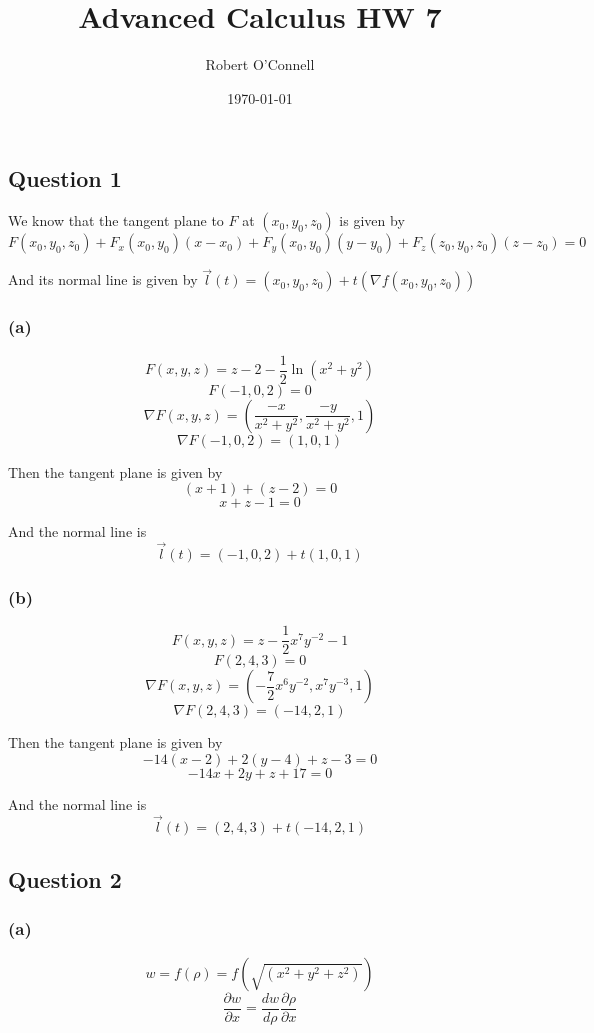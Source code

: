 \documentclass{article}
\title{\textbf{Advanced Calculus HW 7}}
\author{Robert O'Connell}
\date{\today}
\begin{document}
\maketitle
\vspace{5mm}
\subsection*{Question 1}
We know that the tangent plane to \(F\) at \((x_0, y_0,z_0)\) is given by
\[
F(x_0,y_0,z_0) + F_x(x_0,y_0)(x-x_0) + F_y(x_0,y_0)(y-y_0)  + F_z(z_0,y_0,z_0)(z-z_0) = 0
\]

And its normal line is given by \(\vec{l}(t) = (x_0,y_0,z_0) + t(\nabla f(x_0,y_0,z_0))\)

\subsubsection*{(a)}
\[
F(x,y,z) = z - 2 - \frac{1}{2}\ln(x^2 + y^2)
\]
\[
F(-1,0,2) = 0
\]
\[
\nabla F(x,y,z) = (\frac{-x}{x^2 + y^2}, \frac{-y}{x^2 + y^2},  1)
\]
\[
\nabla F(-1,0,2) = (1,0,1)
\]

Then the tangent plane is given by
\[
(x+1) + (z-2) = 0
\]
\[
x+z-1 =0
\]

And the normal line is 
\[
\vec{l}(t) = (-1,0,2) + t(1,0,1)
\]

\subsubsection*{(b)}
\[
F(x,y,z) = z - \frac{1}{2}x^7y^{-2} -1
\]
\[
F(2,4,3) = 0
\]
\[
\nabla F(x,y,z) = (-\frac{7}{2}x^6y^{-2}, x^7y^{-3},  1)
\]
\[
\nabla F(2,4,3) = (-14,2,1)
\]

Then the tangent plane is given by
\[
-14(x-2) + 2(y-4)+ z - 3 = 0
\]
\[
-14x + 2y + z + 17 =0
\]

And the normal line is 
\[
\vec{l}(t) = (2,4,3) + t(-14,2,1)
\]





\subsection*{Question 2}
\subsubsection*{(a)}
\[
w = f(\rho) = f(\sqrt{(x^2 + y^2 + z^2)})
\]
\[
\frac{\partial w}{\partial x} = \frac{dw}{d\rho} \frac{\partial \rho}{\partial x} 
\]
\end{document}
